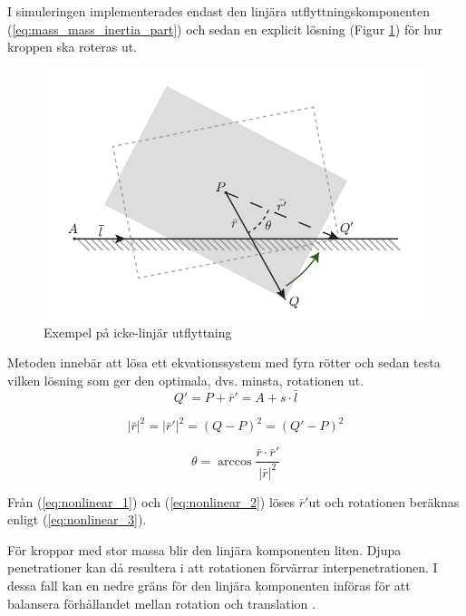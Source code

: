 \documentclass[a4paper,12pt,twopage,swedish]{article}
\begin{document}
I simuleringen implementerades endast den linjära utflyttningskomponenten (\ref{eq:mass_mass_inertia_part}) och sedan en explicit lösning (Figur \ref{fig:nonlinear}) för hur kroppen ska roteras ut.

\begin{figure}[H]
	\centering
	\includegraphics{illustrations/nonlinear.pdf}
	\caption{Exempel på icke-linjär utflyttning}
	\label{fig:nonlinear}
\end{figure}

Metoden innebär att lösa ett ekvationssystem med fyra rötter och sedan testa vilken lösning som ger den optimala, dvs. minsta,  rotationen ut.
\begin{equation} \label{eq:nonlinear_1}
	Q' = P + \bar{r}' = A + s \cdot \bar{l}
\end{equation}

\begin{equation}\label{eq:nonlinear_2}
	|\bar{r}|^2 = |\bar{r}'|^2 = (Q-P)^2 = (Q' - P)^2
\end{equation}

\begin{equation}\label{eq:nonlinear_3}
	\theta = \arccos{\frac{\bar{r}\cdot\bar{r} '}{|\bar{r}|^2}}
\end{equation}

Från (\ref{eq:nonlinear_1}) och (\ref{eq:nonlinear_2}) löses $\bar{r}'$ut och rotationen beräknas enligt (\ref{eq:nonlinear_3}).

För kroppar med stor massa blir den linjära komponenten liten. Djupa penetrationer kan då resultera i att rotationen förvärrar interpenetrationen. I dessa fall kan en nedre gräns för den linjära komponenten införas för att balansera förhållandet mellan rotation och translation \cite{millington07}.
\end{document}
